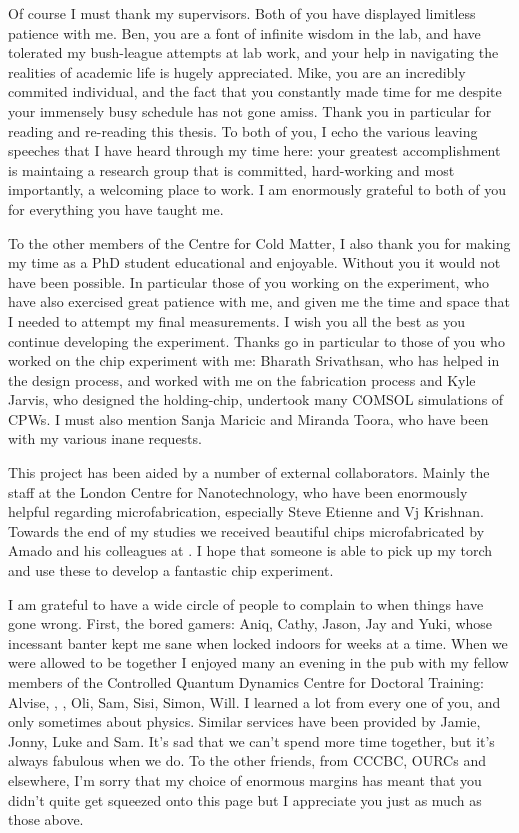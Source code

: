 \begin{singlespace}
Of course I must thank my supervisors. Both of you have displayed limitless
patience with me. Ben, you are a font of infinite wisdom in the lab, and have
tolerated my bush-league attempts at lab work, and your help in navigating the
realities of academic life is hugely appreciated. Mike, you are an incredibly
commited individual, and the fact that you constantly made time for me despite
your immensely busy schedule has not gone amiss. Thank you in particular for
reading and re-reading this thesis.
%
To both of you, I echo the various leaving speeches that I have heard through
my time here: your greatest accomplishment is maintaing a research group that
is committed, hard-working and most importantly, a welcoming place to work.
I am enormously grateful to both of you for everything you have taught me.

To the other members of the Centre for Cold Matter, I also thank you for making
my time as a PhD student educational and enjoyable. Without you it would not
have been possible. In particular those of you working on the \CaF{}
experiment, who have also exercised great patience with me, and given me
the time and space that I needed to attempt my final measurements. I wish you
all the best as you continue developing the experiment. Thanks go in particular
to those of you who worked on the chip experiment with me:
Bharath Srivathsan, who has helped in the design process, and worked
with me on the fabrication process and  Kyle Jarvis, who designed the holding-chip,
undertook many COMSOL simulations of CPWs. 
%
I must also mention Sanja Maricic
and Miranda Toora, who have been  with my various inane
requests.

This project has been aided by a number of external collaborators. Mainly the
staff at the London Centre for Nanotechnology, who have been enormously helpful
regarding microfabrication, especially Steve Etienne and Vj Krishnan. Towards
the end of my studies we received beautiful chips microfabricated by Amado
 and his colleagues at . I hope
that someone is able to pick up my torch and use these to develop a fantastic
\CaF{} chip experiment.

I am grateful to have a wide circle of people to complain to when things have
gone wrong.  First, the bored gamers: Aniq, Cathy, Jason, Jay and Yuki, whose
incessant banter kept me sane when locked indoors for weeks at a time. When we
were allowed to be together I enjoyed many an evening in the pub with my fellow
members of the Controlled Quantum Dynamics Centre for Doctoral Training:
Alvise, , , Oli, Sam, Sisi, Simon, Will. I learned a lot
from every one of you, and only sometimes about physics. Similar services have
been provided by Jamie, Jonny, Luke and Sam. It's sad that we can't spend more
time together, but it's always fabulous when we do. To the other
friends, from CCCBC, OURCs and elsewhere, I'm sorry that my choice of enormous
margins has meant that you didn't quite get squeezed onto this page but I
appreciate you just as much as those above.


\end{singlespace}
